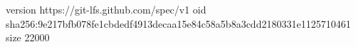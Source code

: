 version https://git-lfs.github.com/spec/v1
oid sha256:9e217bfb078fe1cbdedf4913decaa15e84c58a5b8a3cdd2180331e1125710461
size 22000
